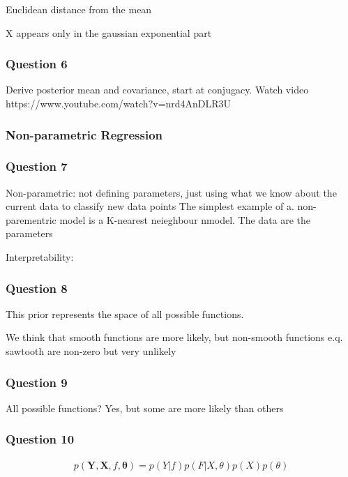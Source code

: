 \documentclass[10pt, a4paper, twocolumn]{article} %
\begin{document}
Euclidean distance from the mean

X appears only in the gaussian exponential part

\subsubsection*{Question 6}

Derive posterior mean and covariance, start at conjugacy. Watch video https://www.youtube.com/watch?v=nrd4AnDLR3U

\subsubsection{Non-parametric Regression}

\subsubsection*{Question 7}

Non-parametric: not defining parameters, just using what we know about the current data to classify new data points
The simplest example of a. non-parementric model is a K-nearest neieghbour nmodel.
The data are the parameters

Interpretability: 

\subsubsection*{Question 8}

This prior represents the space of all possible functions. 

We think that smooth functions are more likely, but non-smooth functions e.q. sawtooth are non-zero but very unlikely

\subsubsection*{Question 9}

All possible functions? Yes, but some are more likely than others

\subsubsection*{Question 10}

\begin{align}
  p(\mathbf{Y},\mathbf{X}, f, \mathbf{\theta}) = p(Y|f)p(F|X,\theta)p(X)p(\theta)
\end{align}
\end{document}
